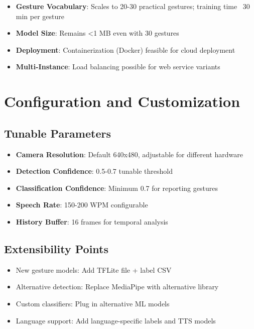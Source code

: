 \begin{itemize}
    \item \textbf{Gesture Vocabulary}: Scales to 20-30 practical gestures; training time ~30 min per gesture
    \item \textbf{Model Size}: Remains <1 MB even with 30 gestures
    \item \textbf{Deployment}: Containerization (Docker) feasible for cloud deployment
    \item \textbf{Multi-Instance}: Load balancing possible for web service variants
\end{itemize}

\section{Configuration and Customization}

\subsection{Tunable Parameters}

\begin{itemize}
    \item \textbf{Camera Resolution}: Default 640x480, adjustable for different hardware
    \item \textbf{Detection Confidence}: 0.5-0.7 tunable threshold
    \item \textbf{Classification Confidence}: Minimum 0.7 for reporting gestures
    \item \textbf{Speech Rate}: 150-200 WPM configurable
    \item \textbf{History Buffer}: 16 frames for temporal analysis
\end{itemize}

\subsection{Extensibility Points}

\begin{itemize}
    \item New gesture models: Add TFLite file + label CSV
    \item Alternative detection: Replace MediaPipe with alternative library
    \item Custom classifiers: Plug in alternative ML models
    \item Language support: Add language-specific labels and TTS models
\end{itemize}

